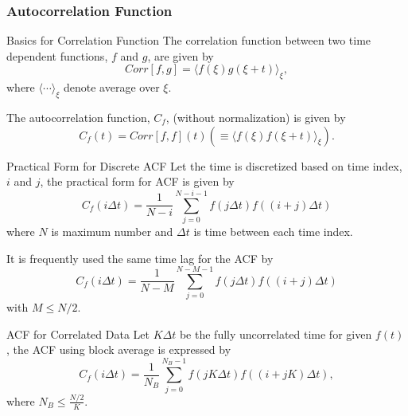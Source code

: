 \documentclass[slidestop, compress, mathserif]{beamer}
\begin{document}
\begin{frame}
  \frametitle<presentation>{Autocorrelation Function}
  \begin{block}{Basics for Correlation Function}
    The correlation function between two time dependent functions, $f$ and $g$, are given by
    \begin{equation}
      Corr[f, g] = \langle f(\xi)g(\xi + t) \rangle_{\xi},
    \end{equation}
    where $\langle \cdots \rangle_{\xi}$ denote average over $\xi$.
  \end{block}
  The autocorrelation function, $C_f$, (without normalization) is given by
  \begin{equation}
    C_f(t) = Corr[f, f](t) \left( \equiv \langle f(\xi)f(\xi + t) \rangle_{\xi} \right).
  \end{equation}
\end{frame}

\begin{frame}
  \begin{block}{Practical Form for Discrete ACF}
    Let the time is discretized based on time index, $i$ and $j$, the practical form for ACF is given by
    \begin{equation}
      C_f(i\Delta t) = \frac{1}{N-i}\sum_{j=0}^{N-i-1}f(j\Delta t)f((i+j)\Delta t)
    \end{equation}
    where $N$ is maximum number and $\Delta t$ is time between each time index.
  \end{block}
  It is frequently used the same time lag for the ACF by
  \begin{equation}
    C_f(i\Delta t) = \frac{1}{N-M}\sum_{j=0}^{N-M-1}f(j\Delta t)f((i+j)\Delta t)
  \end{equation}
  with $M\leq N/2$.
\end{frame}

\begin{frame}
  \begin{block}{ACF for Correlated Data}
    Let $K\Delta t$ be the fully uncorrelated time for given $f(t)$, the ACF using block average is expressed by
    \begin{equation}
      C_f(i\Delta t) = \frac{1}{N_B}\sum_{j=0}^{N_B - 1}f(jK\Delta t)f((i+jK)\Delta t),
    \end{equation}
    where $N_B \leq \frac{N/2}{K}$.
  \end{block}
\end{frame}
\end{document}
